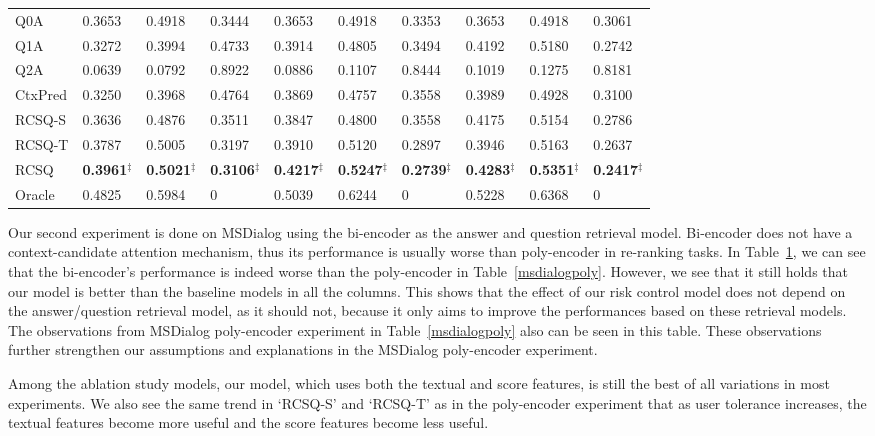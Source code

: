 \documentclass[format=acmsmall, review=False, screen=true]{acmart}
\begin{document}
\begin{table}[t]
{\begin{tabular}{l|l|l|l|l|l|l|l|l|l}
Q0A     & 0.3653    & 0.4918    & 0.3444    & 0.3653    & 0.4918    &  0.3353   &  0.3653    & 0.4918    & 0.3061    \\ 
Q1A     & 0.3272    & 0.3994    & 0.4733    & 0.3914 & 0.4805  & 0.3494 & 0.4192 & 0.5180 & 0.2742   \\ 
Q2A     &  0.0639  & 0.0792  & 0.8922    & 0.0886   & 0.1107   &  0.8444  & 0.1019  & 0.1275  & 0.8181    \\ 
CtxPred & 0.3250  & 0.3968    & 0.4764   & 0.3869 & 0.4757 & 0.3558  & 0.3989  & 0.4928  & 0.3100            \\ \hline
RCSQ-S &  0.3636   & 0.4876    & 0.3511   & 0.3847 & 0.4800 & 0.3558  & 0.4175  & 0.5154    & 0.2786    \\ 
RCSQ-T &  0.3787  & 0.5005  & 0.3197 &  0.3910 & 0.5120  & 0.2897 &  0.3946 & 0.5163  & 0.2637  \\ 
RCSQ   & \textbf{0.3961}$^{\ddag}$    & \textbf{0.5021}$^{\ddag}$   & \textbf{0.3106}$^{\ddag}$ &  \textbf{0.4217}$^{\ddag}$ &  \textbf{0.5247}$^{\ddag}$ &   \textbf{0.2739}$^{\ddag}$ & \textbf{0.4283}$^{\ddag}$  & \textbf{0.5351}$^{\ddag}$  &  \textbf{0.2417}$^{\ddag}$           \\ \hline
Oracle  & 0.4825    & 0.5984   & 0  & 0.5039  & 0.6244  & 0   & 0.5228  & 0.6368  & 0   \\ \hline\hline
\end{tabular}
}
\label{msdialogbi}
\end{table}

Our second experiment is done on MSDialog using the bi-encoder as the answer and question retrieval model. Bi-encoder does not have a context-candidate attention mechanism, thus its performance is usually worse than poly-encoder in re-ranking tasks. In Table~\ref{msdialogbi}, we can see that the bi-encoder's performance is indeed worse than the poly-encoder in Table~\ref{msdialogpoly}. However, we see that it still holds that our model is better than the baseline models in all the columns. This shows that the effect of our risk control model does not depend on the answer/question retrieval model, as it should not, because it only aims to improve the performances based on these retrieval models. The observations from MSDialog poly-encoder experiment in Table~\ref{msdialogpoly} also can be seen in this table. These observations further strengthen our assumptions and explanations in the MSDialog poly-encoder experiment.

Among the ablation study models, our model, which uses both the textual and score features, is still the best of all variations in most experiments. We also see the same trend in `RCSQ-S' and `RCSQ-T' as in the poly-encoder experiment that as user tolerance increases, the textual features become more useful and the score features become less useful.
\end{document}

